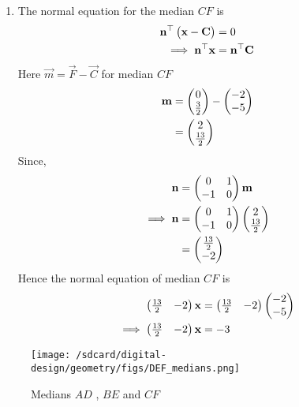 \documentclass[11pt]{book}
\begin{document}
\begin{enumerate}[label=\thesection.\arabic*.,ref=\thesection.\theenumi]
\begin{enumerate}
\item The normal equation for the median $CF$ is
\begin{align}
\mathbf{n}^{\top}\begin{pmatrix}\mathbf{x}-\mathbf{C}\end{pmatrix}&=0\\
\implies
\mathbf{n}^{\top}\mathbf{x}&=\mathbf{n}^{\top}\mathbf{C}
\end{align}
Here $\vec{m} = \vec{F}- \vec{C}$ for median $CF$
\begin{align}
\mathbf{m}&=\begin{pmatrix}0\\ \frac{3}{2}\end{pmatrix} - \begin{pmatrix}-2\\-5\end{pmatrix}\\
       &=\begin{pmatrix}2\\ \frac{13}{2}\end{pmatrix}
\end{align}
Since,
\begin{align}
  \mathbf{n} &= \begin{pmatrix}0 & 1\\
  -1 & 0\end{pmatrix}\mathbf{m}\\
\implies
\mathbf{n} &= \begin{pmatrix}0 & 1\\
  -1 & 0\end{pmatrix}\begin{pmatrix}2 \\ \frac{13}{2} \end{pmatrix}\\
        &= \begin{pmatrix}\frac{13}{2} \\ -2\end{pmatrix}
\end{align}
Hence the normal equation of median $CF$ is 
\begin{align}
    \begin{pmatrix} \frac{13}{2} & -2 \end{pmatrix}\mathbf{x}&=\begin{pmatrix}\frac{13}{2} & -2\end{pmatrix}\begin{pmatrix}-2\\-5\end{pmatrix}\\
\implies
    \begin{pmatrix}\frac{13}{2} & -2\end{pmatrix}\mathbf{x}&=-3
\end{align}
\end{enumerate}
\begin{figure}
\texttt{[image: /sdcard/digital-design/geometry/figs/DEF\_medians.png]}
\caption{ Medians $AD$ , $BE$ and $CF$}
\label{fig: medians}
\end{figure}



\end{enumerate}
\end{document}
